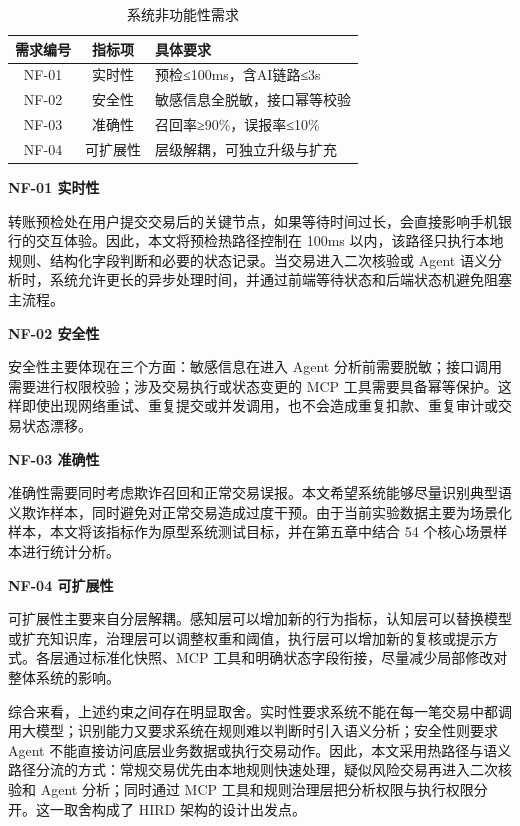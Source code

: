 \documentclass{xduugthesis}
\begin{document}
\begin{table}[H]
    \centering
    \caption{系统非功能性需求}
    \label{tab:nonfunctional-req}
    \begin{tabular}{|c|c|p{5cm}|}
        \hline
        需求编号 & 指标项 & 具体要求 \\
        \hline
        NF-01 & 实时性 & 预检≤100ms，含AI链路≤3s \\
        \hline
        NF-02 & 安全性 & 敏感信息全脱敏，接口幂等校验 \\
        \hline
        NF-03 & 准确性 & 召回率≥90\%，误报率≤10\% \\
        \hline
        NF-04 & 可扩展性 & 层级解耦，可独立升级与扩充 \\
        \hline
    \end{tabular}
\end{table}

\textbf{NF-01 实时性}

转账预检处在用户提交交易后的关键节点，如果等待时间过长，会直接影响手机银行的交互体验。因此，本文将预检热路径控制在 100ms 以内，该路径只执行本地规则、结构化字段判断和必要的状态记录。当交易进入二次核验或 Agent 语义分析时，系统允许更长的异步处理时间，并通过前端等待状态和后端状态机避免阻塞主流程。

\textbf{NF-02 安全性}

安全性主要体现在三个方面：敏感信息在进入 Agent 分析前需要脱敏；接口调用需要进行权限校验；涉及交易执行或状态变更的 MCP 工具需要具备幂等保护。这样即使出现网络重试、重复提交或并发调用，也不会造成重复扣款、重复审计或交易状态漂移。

\textbf{NF-03 准确性}

准确性需要同时考虑欺诈召回和正常交易误报。本文希望系统能够尽量识别典型语义欺诈样本，同时避免对正常交易造成过度干预。由于当前实验数据主要为场景化样本，本文将该指标作为原型系统测试目标，并在第五章中结合 54 个核心场景样本进行统计分析。

\textbf{NF-04 可扩展性}

可扩展性主要来自分层解耦。感知层可以增加新的行为指标，认知层可以替换模型或扩充知识库，治理层可以调整权重和阈值，执行层可以增加新的复核或提示方式。各层通过标准化快照、MCP 工具和明确状态字段衔接，尽量减少局部修改对整体系统的影响。

综合来看，上述约束之间存在明显取舍。实时性要求系统不能在每一笔交易中都调用大模型；识别能力又要求系统在规则难以判断时引入语义分析；安全性则要求 Agent 不能直接访问底层业务数据或执行交易动作。因此，本文采用热路径与语义路径分流的方式：常规交易优先由本地规则快速处理，疑似风险交易再进入二次核验和 Agent 分析；同时通过 MCP 工具和规则治理层把分析权限与执行权限分开。这一取舍构成了 HIRD 架构的设计出发点。
\end{document}
